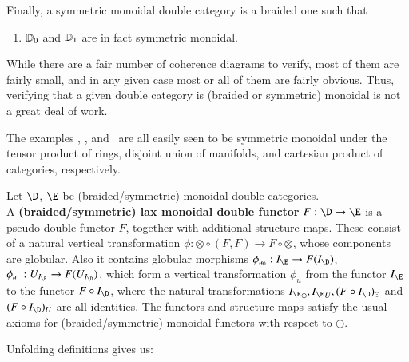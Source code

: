 \documentclass{amsart}
\begin{document}
Finally, a symmetric monoidal double category is a braided one such that
\begin{enumerate}\setcounter{enumi}{\value{mondbl}}
\item $\mathbb{D}_0$ and $\mathbb{D}_1$ are in fact symmetric monoidal.
\end{enumerate}
While there are a fair number of coherence diagrams to verify, most of
them are fairly small, and in any given case most or all of them are
fairly obvious.  Thus, verifying that a given double category is
(braided or symmetric) monoidal is not a great deal of work.

\begin{eg}
  The examples \lMod, \lnCob, and \lProf\ are all easily seen to be
  symmetric monoidal under the tensor product of rings, disjoint union
  of manifolds, and cartesian product of categories, respectively.
\end{eg}

\begin{defn}\label{def:monfunc}
Let $\D$, $\E$ be (braided/symmetric) monoidal double categories. \\A {\bf (braided/symmetric) lax monoidal double functor} $F: \D \rightarrow \E$ is a pseudo double functor $F$, together with additional structure maps. These consist of a natural vertical  transformation $\phi : \otimes \circ (F,F) \rightarrow F \circ \otimes$, whose components are globular.  Also it contains globular morphisms $\phi_{u_0} : I_{\E} \rightarrow F(I_{\D})$, $\phi_{u_1} : U_{I_{\E}} \rightarrow F(U_{I_{\D}})$, which form a vertical transformation $\phi_u$ from the functor $I_{\E}$ to the functor $F \circ I_{\D}$, where the natural transformations ${I_{\E}}_{\odot}, {I_{\E}}_{U}, (F \circ I_{\D})_{\odot}$ and $ (F \circ I_{\D})_{U}$ are all identities.
The functors and structure maps satisfy the usual axioms for (braided/symmetric) monoidal functors with respect to $\odot$.
\end{defn}

Unfolding definitions gives us:
\end{document}
